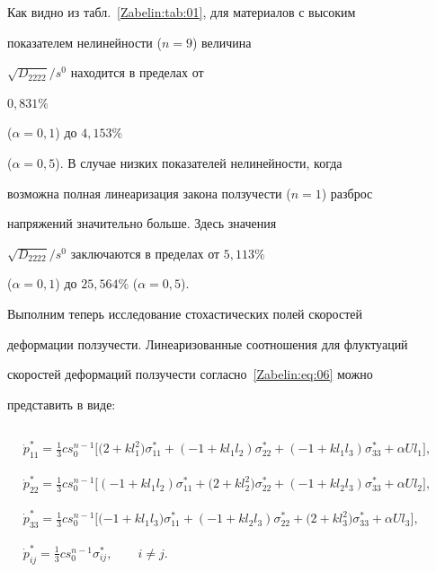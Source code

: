Как видно из табл.~\ref{Zabelin:tab:01}, для материалов с высоким

показателем нелинейности ($n=9$) величина

${\sqrt{D_{2222}}}/{s^0}$ находится в пределах от

$0{,}831\%$ %

($\alpha=0{,}1$) до $4{,}153\%$ %

($\alpha=0{,}5$). В случае низких показателей нелинейности, когда

возможна полная линеаризация закона ползучести ($n=1$) разброс

напряжений значительно больше. Здесь значения

${\sqrt{D_{2222}}}/{s^0}$ заключаются в пределах от $5{,}113\%$

($\alpha=0{,}1$) до $25{,}564\%$ ($\alpha=0{,}5$).



Выполним теперь исследование стохастических полей скоростей

деформации ползучести. Линеаризованные соотношения для флуктуаций

скоростей деформаций ползучести согласно~\eqref{Zabelin:eq:06} можно

представить в виде:

\begin{equation}

\begin{array}{l}

\displaystyle \dot{p}_{11}^*=\frac13cs_0^{n-1}\Big[\big(2+kl_1^2\big)\sigma_{11}^*+

(-1+kl_1l_2)\sigma_{22}^*+(-1+kl_1l_3)\sigma_{33}^*+\alpha Ul_1\Big],\phantom{\int\limits^{\frac12}}\\

\displaystyle 

\dot{p}_{22}^*=\frac13cs_0^{n-1}\Big[(-1+kl_1l_2)\sigma_{11}^*+

\big(2+kl_2^2)\sigma_{22}^*+(-1+kl_2l_3)\sigma_{33}^*+\alpha Ul_2\Big],\phantom{\int\limits^{\frac12}}\\

\displaystyle 

\dot{p}_{33}^*=\frac13cs_0^{n-1}\Big[(-1+kl_1l_3\big)\sigma_{11}^*+

(-1+kl_2l_3)\sigma_{22}^*+\big(2+kl_3^2\big)\sigma_{33}^*+\alpha

Ul_3\Big],\phantom{\int\limits^{\frac12}}\\

\displaystyle 

\dot{p}_{ij}^*=\frac13cs_0^{n-1}\sigma_{ij}^*,\qquad i\neq j.\phantom{\int\limits^{\frac12}}

\end{array}

\label{Zabelin:eq:16}

\end{equation}



